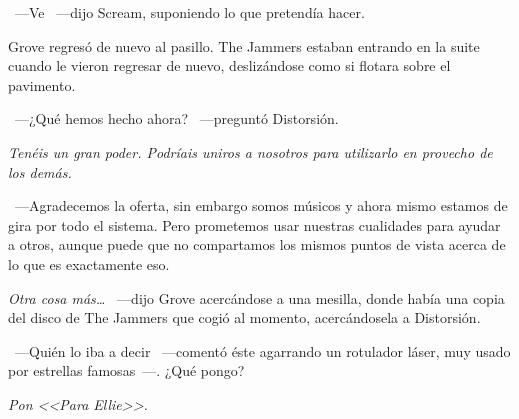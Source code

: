 ~---Ve ~---dijo Scream, suponiendo lo que pretendía hacer.

Grove regresó de nuevo al pasillo. The Jammers estaban entrando en la suite cuando le vieron regresar de nuevo, deslizándose como si flotara sobre el pavimento.

~---¿Qué hemos hecho ahora? ~---preguntó Distorsión.

\emph{Tenéis un gran poder. Podríais uniros a nosotros para utilizarlo en provecho de los demás.}

~---Agradecemos la oferta, sin embargo somos músicos y ahora mismo estamos de gira por todo el sistema. Pero prometemos usar nuestras cualidades para ayudar a otros, aunque puede que no compartamos los mismos puntos de vista acerca de lo que es exactamente eso.

\emph{Otra cosa más\dots} ~---dijo Grove acercándose a una mesilla, donde había una copia del disco de The Jammers que cogió al momento, acercándosela a Distorsión.

~---Quién lo iba a decir ~---comentó éste agarrando un rotulador láser, muy usado por estrellas famosas~---. ¿Qué pongo?

\emph{Pon <<Para Ellie>>.}
